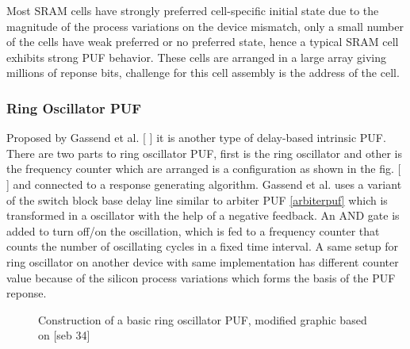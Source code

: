 Most SRAM cells have strongly preferred cell-specific initial state due to the magnitude of the process variations on the device mismatch, only a small number of the cells have weak preferred or no preferred state, hence a typical SRAM cell exhibits strong PUF behavior. These cells are arranged in a large array giving millions of reponse bits, challenge for this cell assembly is the address of the cell.\\

\subsubsection{Ring Oscillator PUF}

Proposed by Gassend et al. [ ] it is another type of delay-based intrinsic PUF. There are two parts to ring oscillator PUF, first is the ring oscillator and other is the frequency counter which are arranged is a configuration as shown in the fig. [ ] and connected to a response generating algorithm. Gassend et al. uses a variant of the switch block base delay line similar to arbiter PUF \ref{arbiterpuf} which is transformed in a oscillator with the help of a negative feedback.
An AND gate is added to turn off/on the oscillation, which is fed to a frequency counter that counts the number of oscillating cycles in a fixed time interval. A same setup for ring oscillator on another device with same implementation has different counter value because of the silicon process variations which forms the basis of the PUF reponse.\\

\begin{figure}
\centering
{}
\caption{Construction of a basic ring oscillator PUF, modified graphic based on [seb 34]}
\label{img:2}
\end{figure}

